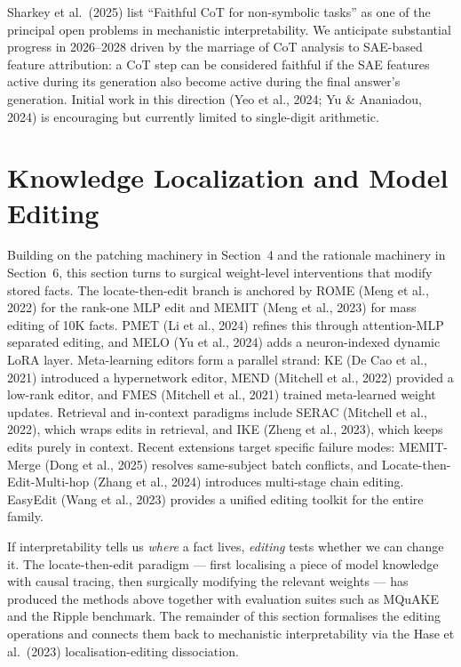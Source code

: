 Sharkey et al.~(2025) list ``Faithful CoT for non-symbolic tasks'' as one of the principal open problems in mechanistic interpretability. We anticipate substantial progress in 2026--2028 driven by the marriage of CoT analysis to SAE-based feature attribution: a CoT step can be considered faithful if the SAE features active during its generation also become active during the final answer's generation. Initial work in this direction (Yeo et al., 2024; Yu \& Ananiadou, 2024) is encouraging but currently limited to single-digit arithmetic.

\section{Knowledge Localization and Model Editing}\label{knowledge-localization-and-model-editing}

Building on the patching machinery in Section~4 and the rationale machinery in Section~6, this section turns to surgical weight-level interventions that modify stored facts. The locate-then-edit branch is anchored by ROME (Meng et al., 2022) for the rank-one MLP edit and MEMIT (Meng et al., 2023) for mass editing of 10K facts. PMET (Li et al., 2024) refines this through attention-MLP separated editing, and MELO (Yu et al., 2024) adds a neuron-indexed dynamic LoRA layer. Meta-learning editors form a parallel strand: KE (De Cao et al., 2021) introduced a hypernetwork editor, MEND (Mitchell et al., 2022) provided a low-rank editor, and FMES (Mitchell et al., 2021) trained meta-learned weight updates. Retrieval and in-context paradigms include SERAC (Mitchell et al., 2022), which wraps edits in retrieval, and IKE (Zheng et al., 2023), which keeps edits purely in context. Recent extensions target specific failure modes: MEMIT-Merge (Dong et al., 2025) resolves same-subject batch conflicts, and Locate-then-Edit-Multi-hop (Zhang et al., 2024) introduces multi-stage chain editing. EasyEdit (Wang et al., 2023) provides a unified editing toolkit for the entire family.

If interpretability tells us \emph{where} a fact lives, \emph{editing} tests whether we can change it. The locate-then-edit paradigm --- first localising a piece of model knowledge with causal tracing, then surgically modifying the relevant weights --- has produced the methods above together with evaluation suites such as MQuAKE and the Ripple benchmark. The remainder of this section formalises the editing operations and connects them back to mechanistic interpretability via the Hase et al.~(2023) localisation-editing dissociation.


